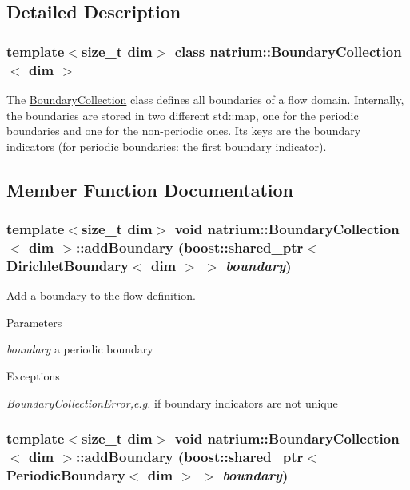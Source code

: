 \subsection{Detailed Description}
\subsubsection*{template$<$size\_\-t dim$>$ class natrium::BoundaryCollection$<$ dim $>$}

The \hyperlink{classnatrium_1_1BoundaryCollection}{BoundaryCollection} class defines all boundaries of a flow domain. Internally, the boundaries are stored in two different std::map, one for the periodic boundaries and one for the non-\/periodic ones. Its keys are the boundary indicators (for periodic boundaries: the first boundary indicator). 

\subsection{Member Function Documentation}
\hypertarget{classnatrium_1_1BoundaryCollection_a907b7a9a09cf2f2affae1ccd66c3d79d}{
\subsubsection[{addBoundary}]{\setlength{\rightskip}{0pt plus 5cm}template$<$size\_\-t dim$>$ void {\bf natrium::BoundaryCollection}$<$ dim $>$::addBoundary (boost::shared\_\-ptr$<$ {\bf DirichletBoundary}$<$ dim $>$ $>$ {\em boundary})}}
\label{classnatrium_1_1BoundaryCollection_a907b7a9a09cf2f2affae1ccd66c3d79d}


Add a boundary to the flow definition. 
\begin{DoxyParams}{Parameters}
\item[{\em boundary}]a periodic boundary \end{DoxyParams}

\begin{DoxyExceptions}{Exceptions}
\item[{\em BoundaryCollectionError,e.g.}]if boundary indicators are not unique \end{DoxyExceptions}
\hypertarget{classnatrium_1_1BoundaryCollection_a9f957b5338bca01c7bd8c21576ec922c}{
\subsubsection[{addBoundary}]{\setlength{\rightskip}{0pt plus 5cm}template$<$size\_\-t dim$>$ void {\bf natrium::BoundaryCollection}$<$ dim $>$::addBoundary (boost::shared\_\-ptr$<$ {\bf PeriodicBoundary}$<$ dim $>$ $>$ {\em boundary})}}
\label{classnatrium_1_1BoundaryCollection_a9f957b5338bca01c7bd8c21576ec922c}


